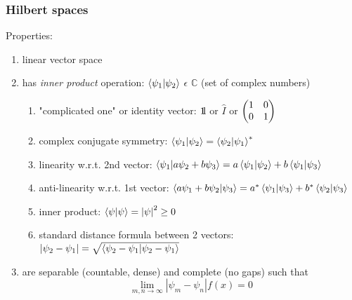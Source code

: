\documentclass[]{article}
\newcommand{\oneQM}{$1\hspace{-0.21em}\text l$}
\begin{document}
\subsubsection{Hilbert spaces}
Properties:
\begin{enumerate}
    \item linear vector space
    \item has \textit{inner product} operation: $\bra{\psi_{1}}\ket{\psi_{2}}$ $\epsilon$ $\mathbb{C}$ (set of complex numbers)
    \begin{enumerate}
        \item "complicated one" or identity vector: \oneQM \hspace{0.1em} or $\hat{I}$ or $\mqty(1 & 0 \\ 0 & 1)$%
        \item complex conjugate symmetry: $\bra{\psi_{1}}\ket{\psi_{2}} = \bra{\psi_{2}}\ket{\psi_{1}}^{*}$
        \item linearity w.r.t. 2nd vector: $\bra{\psi_{1}}\ket{a\psi_{2}+b\psi_{3}} = a\bra{\psi_{1}}\ket{\psi_{2}}+b\bra{\psi_{1}}\ket{\psi_{3}}$
        \item anti-linearity w.r.t. 1st vector: $\bra{a\psi_{1}+b\psi_{2}}\ket{\psi_{3}} = a^{*}\bra{\psi_{1}}\ket{\psi_{3}}+b^{*}\bra{\psi_{2}}\ket{\psi_{3}}$
        \item inner product: $\bra{\psi}\ket{\psi} = \left|\psi\right|^{2}\geq0$
        \item standard distance formula between 2 vectors: $\left|\psi_{2}-\psi_{1}\right| = \sqrt{\bra{\psi_{2}-\psi_{1}}\ket{\psi_{2}-\psi_{1}}}$
    \end{enumerate}
    \item are separable (countable, dense) and complete (no gaps) such that \[ \lim_{m,n\to\infty}\left|\psi_{m}-\psi_{n}\right| f(x) = 0 \]
\end{enumerate}
\end{document}

